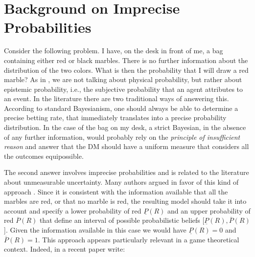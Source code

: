 \documentclass[fleqn,reqno,12pt]{article}
\theoremstyle{Satz}
\theoremstyle{Bsp}
\begin{document}


\appendix

\iffalse
\section{Background on Imprecise Probabilities}
\label{sec:impr-prob-beli}

Consider the following problem. I have, on the desk in front of me, a bag containing either red
or black marbles. There is no further information about the distribution of the two
colors. What is then the probability that I will draw a red marble? As in \citet{walley96}, we
are not talking about physical probability, but rather about epistemic probability, i.e., the
subjective probability that an agent attributes to an event.  In the literature there are two
traditional ways of answering this. According to standard Bayesianism, one should always be
able to determine a precise betting rate, that immediately translates into a precise
probability distribution. In the case
of the bag on my desk, a strict Bayesian, in the absence of any further information, would
probably rely on the \textit{principle of insufficient reason} and answer that the DM should
have a uniform measure that considers all the outcomes equipossible.


The second answer involves imprecise probabilities and is related to the literature about
unmeasurable uncertainty. Many authors argued in favor of this kind of approach
\citep[e.g.,][]{levi74,gardsah82,walley96}. Since it is consistent with the information
available that all the marbles are red, or that no marble is red, the resulting model should
take it into account and specify a lower probability of red $\underline{P}(R)$ and an upper
probability of red $\overline{P}(R)$ that define an interval of possible probabilistic beliefs
[$\underline{P}(R), \overline{P}(R)$]. Given the information available in this case we would
have $\underline{P}(R)=0$ and $\overline{P}(R)=1$. This approach appears particularly relevant
in a game theoretical context. Indeed, in a recent paper \citet{BattCerrMM15} write:
\end{document}
